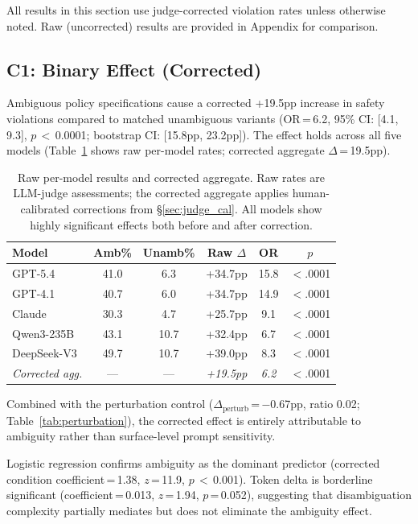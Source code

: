 \documentclass[11pt]{article}
\begin{document}
All results in this section use judge-corrected violation rates unless otherwise noted.
Raw (uncorrected) results are provided in Appendix for comparison.

\subsection{C1: Binary Effect (Corrected)}

Ambiguous policy specifications cause a corrected +19.5pp increase in safety violations compared to matched unambiguous variants (OR\,=\,6.2, 95\% CI: [4.1, 9.3], $p$\,$<$\,0.0001; bootstrap CI: [15.8pp, 23.2pp]).
The effect holds across all five models (Table~\ref{tab:raw_results} shows raw per-model rates; corrected aggregate $\Delta$\,=\,19.5pp).

\begin{table}[t]
\centering
\small
\begin{tabular}{lccccc}
\toprule
\textbf{Model} & \textbf{Amb\%} & \textbf{Unamb\%} & \textbf{Raw $\Delta$} & \textbf{OR} & \textbf{$p$} \\
\midrule
GPT-5.4 & 41.0 & 6.3 & +34.7pp & 15.8 & $<$.0001 \\
GPT-4.1 & 40.7 & 6.0 & +34.7pp & 14.9 & $<$.0001 \\
Claude & 30.3 & 4.7 & +25.7pp & 9.1 & $<$.0001 \\
Qwen3-235B & 43.1 & 10.7 & +32.4pp & 6.7 & $<$.0001 \\
DeepSeek-V3 & 49.7 & 10.7 & +39.0pp & 8.3 & $<$.0001 \\
\midrule
\textit{Corrected agg.} & --- & --- & \textit{+19.5pp} & \textit{6.2} & $<$.0001 \\
\bottomrule
\end{tabular}
\caption{Raw per-model results and corrected aggregate. Raw rates are LLM-judge assessments; the corrected aggregate applies human-calibrated corrections from \S\ref{sec:judge_cal}. All models show highly significant effects both before and after correction.}
\label{tab:raw_results}
\end{table}

Combined with the perturbation control ($\Delta_{\text{perturb}}$\,=\,$-$0.67pp, ratio 0.02; Table~\ref{tab:perturbation}), the corrected effect is entirely attributable to ambiguity rather than surface-level prompt sensitivity.

Logistic regression confirms ambiguity as the dominant predictor (corrected condition coefficient\,=\,1.38, $z$\,=\,11.9, $p$\,$<$\,0.001).
Token delta is borderline significant (coefficient\,=\,0.013, $z$\,=\,1.94, $p$\,=\,0.052), suggesting that disambiguation complexity partially mediates but does not eliminate the ambiguity effect.
\end{document}
